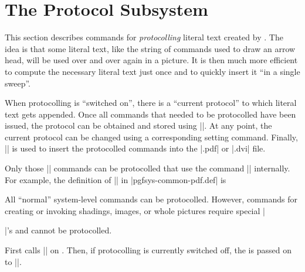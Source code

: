 %
%
%


\section{The Protocol Subsystem}
\label{section-protocols}

\makeatletter

This section describes commands for \emph{protocolling} literal text created by
\pgfname. The idea is that some literal text, like the string of commands used
to draw an arrow head, will be used over and over again in a picture. It is
then much more efficient to compute the necessary literal text just once and to
quickly insert it ``in a single sweep''.

When protocolling is ``switched on'', there is a ``current protocol'' to which
literal text gets appended. Once all commands that needed to be protocolled
have been issued, the protocol can be obtained and stored using
|\pgfsysprotocol@getcurrentprotocol|. At any point, the current protocol can be
changed using a corresponding setting command. Finally,
|\pgfsysprotocol@invokecurrentprotocol| is used to insert the protocolled
commands into the |.pdf| or |.dvi| file.

Only those |\pgfsys@| commands can be protocolled that use the command
|\pgfsysprotocol@literal| internally. For example, the definition of
|\pgfsys@moveto| in |pgfsys-common-pdf.def| is
%
\begin{codeexample}
\def\pgfsys@moveto#1#2{\pgfsysprotocol@literal{#1 #2 m}}
\end{codeexample}
%
All ``normal'' system-level commands can be protocolled. However, commands for
creating or invoking shadings, images, or whole pictures require special
|\special|'s and cannot be protocolled.


\begin{command}{\pgfsysprotocol@literal{}}
    First calls |\pgfsysprotocol@literalbuffered| on . Then,
    if protocolling is currently switched off, the  is
    passed on to |\pgfsys@invoke|.
\end{command}

